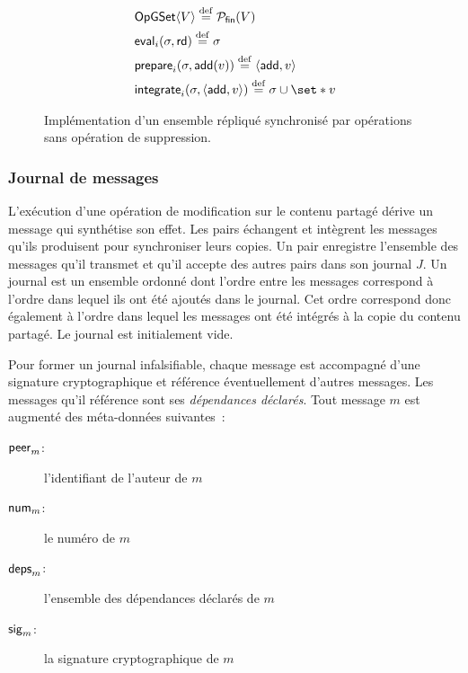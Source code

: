 \begin{figure}[bth]
\centering
\begin{align}
&\trm{OpGSet}\tuple*{V} \defeq \powerfset{V} \label{eq:op-gset-state}\\
&\trm{eval}_i(\sigma, \trm{rd}) \defeq \sigma \label{eq:op-gset-eval}\\
&\trm{prepare}_i(\sigma, \trm{add}(v)) \defeq \tuple*{\trm{add}, v} \label{eq:op-gset-prep-add}\\
&\trm{integrate}_i(\sigma, \tuple*{\trm{add}, v}) \defeq \sigma \cup \set*{v} \label{eq:op-gset-integr-add}
\end{align}
\caption[Implémentation d'un ensemble répliqué synchronisé par opérations sans opération de suppression]{Implémentation d'un ensemble répliqué synchronisé par opérations sans opération de suppression.}\label{fig:op-gset}
\end{figure}


\subsubsection{Journal de messages}

L'exécution d'une opération de modification sur le contenu partagé dérive un message qui synthétise son effet.
Les pairs échangent et intègrent les messages qu'ils produisent pour synchroniser leurs copies.
Un pair enregistre l'ensemble des messages qu'il transmet et qu'il accepte des autres pairs dans son journal $J$.
Un journal est un ensemble ordonné dont l'ordre entre les messages correspond à l'ordre dans lequel ils ont été ajoutés dans le journal.
Cet ordre correspond donc également à l'ordre dans lequel les messages ont été intégrés à la copie du contenu partagé.
Le journal est initialement vide.

Pour former un journal infalsifiable, chaque message est accompagné d'une signature cryptographique et référence éventuellement d'autres messages.
Les messages qu'il référence sont ses \emph{dépendances déclarés}.
Tout message $m$ est augmenté des méta-données suivantes~:
\begin{description}
    \item[$\operatorname{\mathsf{peer}}_m$:] l'identifiant de l'auteur de $m$ 
    \item[$\operatorname{\mathsf{num}}_m$:] le numéro de $m$
    \item[$\operatorname{\mathsf{deps}}_m$:] l'ensemble des dépendances déclarés de $m$
    \item[$\operatorname{\mathsf{sig}}_m$:] la signature cryptographique de $m$
\end{description}

